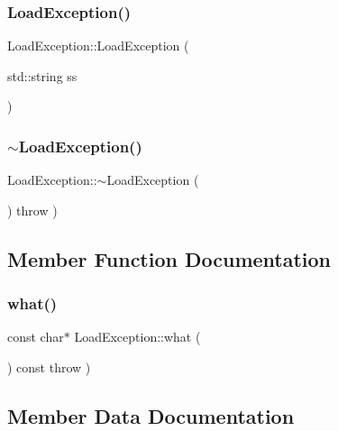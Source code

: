 \subsubsection{\texorpdfstring{Load\+Exception()}{LoadException()}}
{\footnotesize\ttfamily Load\+Exception\+::\+Load\+Exception (\begin{DoxyParamCaption}\item[{std\+::string}]{ss }\end{DoxyParamCaption})\hspace{0.3cm}{\ttfamily [inline]}}

\hypertarget{struct_load_exception_afb006cdbeb6ca9bab0c9bc3f7df9291b}{}\label{struct_load_exception_afb006cdbeb6ca9bab0c9bc3f7df9291b} 
\subsubsection{\texorpdfstring{$\sim$\+Load\+Exception()}{~LoadException()}}
{\footnotesize\ttfamily Load\+Exception\+::$\sim$\+Load\+Exception (\begin{DoxyParamCaption}{ }\end{DoxyParamCaption}) throw  ) \hspace{0.3cm}{\ttfamily [inline]}}



\subsection{Member Function Documentation}
\hypertarget{struct_load_exception_aa77af17720977ac8f651a4678ecf672c}{}\label{struct_load_exception_aa77af17720977ac8f651a4678ecf672c} 
\subsubsection{\texorpdfstring{what()}{what()}}
{\footnotesize\ttfamily const char$\ast$ Load\+Exception\+::what (\begin{DoxyParamCaption}{ }\end{DoxyParamCaption}) const throw  ) \hspace{0.3cm}{\ttfamily [inline]}}



\subsection{Member Data Documentation}
\hypertarget{struct_load_exception_ac148fff547e53eac53f36a2eb18f312a}{}\label{struct_load_exception_ac148fff547e53eac53f36a2eb18f312a} 
